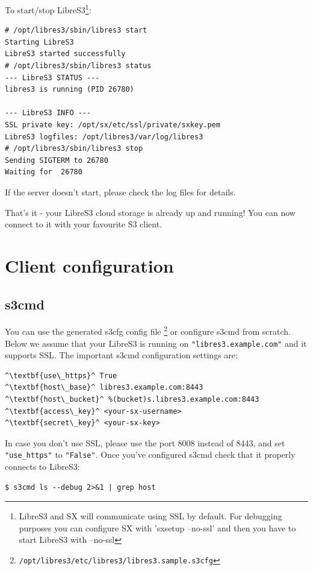 To start/stop LibreS3\footnote{LibreS3 and SX will communicate using SSL by
default. For debugging purposes you can configure SX with 'sxsetup --no-ssl' and then you have to start LibreS3 with --no-ssl}:

\small
\begin{lstlisting}
# /opt/libres3/sbin/libres3 start
Starting LibreS3
LibreS3 started successfully
# /opt/libres3/sbin/libres3 status
--- LibreS3 STATUS ---
libres3 is running (PID 26780)

--- LibreS3 INFO ---
SSL private key: /opt/sx/etc/ssl/private/sxkey.pem
LibreS3 logfiles: /opt/libres3/var/log/libres3
# /opt/libres3/sbin/libres3 stop
Sending SIGTERM to 26780
Waiting for  26780
\end{lstlisting}
\LARGE

If the server doesn't start, please check the log files for details.

That's it - your LibreS3 cloud storage is already up and running!
You can now connect to it with your favourite S3 client.

\chapter{Client configuration}
\section*{s3cmd}

You can use the generated s3cfg config file
\footnote{\verb|/opt/libres3/etc/libres3/libres3.sample.s3cfg|}
 or configure s3cmd from scratch.
Below we assume that your LibreS3
is running on \verb|"libres3.example.com"| and it supports SSL.
The important s3cmd configuration settings are:

\small
\begin{lstlisting}
^\textbf{use\_https}^ True
^\textbf{host\_base}^ libres3.example.com:8443
^\textbf{host\_bucket}^ %(bucket)s.libres3.example.com:8443
^\textbf{access\_key}^ <your-sx-username>
^\textbf{secret\_key}^ <your-sx-key>
\end{lstlisting}
\LARGE

In case you don't use SSL, please use the port 8008 instead of 8443, and set
\verb|"use_https"| to \verb|"False"|. Once you've configured s3cmd check
that it properly connects to LibreS3:
\small
\begin{lstlisting}
$ s3cmd ls --debug 2>&1 | grep host
\end{lstlisting}
\LARGE

